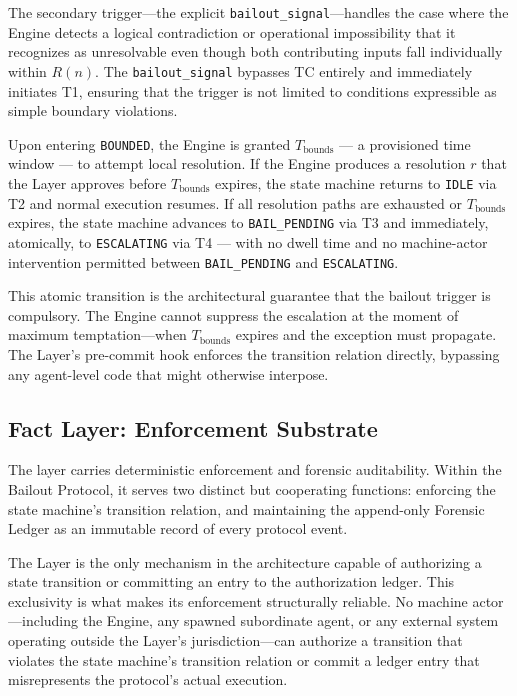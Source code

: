 The secondary trigger---the explicit \texttt{bailout\_signal}---handles the case
where the \bounds{} Engine detects a logical contradiction or operational
impossibility that it recognizes as unresolvable even though both contributing
inputs fall individually within $R(n)$.  The \texttt{bailout\_signal} bypasses
TC entirely and immediately initiates T1, ensuring that the trigger is not
limited to conditions expressible as simple boundary violations.

Upon entering \texttt{BOUNDED}, the \bounds{} Engine is granted $T_{\text{bounds}}$
--- a provisioned time window --- to attempt local resolution.  If the
\bounds{} Engine produces a resolution $r$ that the \fact{} Layer approves before
$T_{\text{bounds}}$ expires, the state machine returns to \texttt{IDLE} via T2 and
normal execution resumes.  If all resolution paths are exhausted or
$T_{\text{bounds}}$ expires, the state machine advances to \texttt{BAIL\_PENDING}
via T3 and immediately, atomically, to \texttt{ESCALATING} via T4 --- with no
dwell time and no machine-actor intervention permitted between
\texttt{BAIL\_PENDING} and \texttt{ESCALATING}.

This atomic transition is the architectural guarantee that the bailout trigger
is compulsory.  The \bounds{} Engine cannot suppress the escalation at the moment
of maximum temptation---when $T_{\text{bounds}}$ expires and the exception must
propagate.  The \fact{} Layer's pre-commit hook enforces the transition relation
directly, bypassing any agent-level code that might otherwise interpose.

\subsection{Fact Layer: Enforcement Substrate}\label{sec:fact-layer}

The \fact{} layer carries deterministic enforcement and forensic auditability.
Within the Bailout Protocol, it serves two distinct but cooperating functions:
enforcing the state machine's transition relation, and maintaining the
append-only Forensic Ledger as an immutable record of every protocol event.

The \fact{} Layer is the only mechanism in the \bxthree{} architecture capable
of authorizing a state transition or committing an entry to the authorization
ledger.  This exclusivity is what makes its enforcement structurally reliable.
No machine actor---including the \bounds{} Engine, any spawned subordinate
agent, or any external system operating outside the \fact{} Layer's
jurisdiction---can authorize a transition that violates the state machine's
transition relation or commit a ledger entry that misrepresents the protocol's
actual execution.

